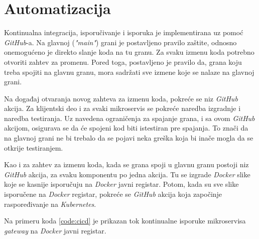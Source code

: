 \section{Automatizacija}
Kontinualna integracija, isporučivanje i isporuka je implementirana uz 
pomoć \textit{GitHub}-a. Na glavnoj (\textit{"main"}) grani 
je postavljeno pravilo zaštite, odnosno onemogućeno je direkto slanje 
koda na tu granu. Za svaku izmenu koda potrebno otvoriti zahtev za 
promenu. Pored toga, postavljeno je pravilo da, grana koju treba spojiti 
na glavnu granu, mora sadržati sve izmene koje se nalaze na glavnoj grani.

Na događaj otvaranja novog zahteva za izmenu koda, pokreće se niz 
\textit{GitHub} akcija. Za klijentski deo i za svaki mikroservis 
se pokreće naredba izgradnje i naredba testiranja. Uz navedena 
ograničenja za spajanje grana, i sa ovom \textit{GitHub} akcijom, 
osigurava se da će spojeni kod biti istestiran pre spajanja. To znači da 
na glavnoj grani ne bi trebalo da se pojavi neka greška koja bi inače mogla 
da se otkrije testiranjem.

Kao i za zahtev za izmenu koda, kada se grana spoji u glavnu granu 
postoji niz \textit{GitHub} akcija, za svaku komponentu po jedna akcija.
Tu se izgrade \textit{Docker} slike koje se kasnije isporučuju na 
\textit{Docker} javni registar. Potom, kada su sve slike isporučene na 
\textit{Docker} registar, pokreće se \textit{GitHub} akcija koja započinje 
raspoređivanje na \textit{Kubernetes}.

Na primeru koda \ref{code:cicd} je prikazan tok kontinualne isporuke
mikroservisa \textit{gateway} na \textit{Docker} javni registar.

